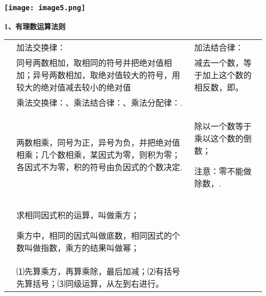 \hypertarget{ux5b66ux79d1ux7f51www.zxxk.com--ux6559ux80b2ux8d44ux6e90ux95e8ux6237ux63d0ux4f9bux8bd5ux9898ux8bd5ux5377ux6559ux6848ux8bfeux4ef6ux6559ux5b66ux8bbaux6587ux7d20ux6750ux7b49ux5404ux7c7bux6559ux5b66ux8d44ux6e90ux5e93ux4e0bux8f7dux8fd8ux6709ux5927ux91cfux4e30ux5bccux7684ux6559ux5b66ux8d44ux8baf-1}{%
\subsubsection{\texorpdfstring{\protect\texttt{[image: image5.png]}}{学科网(www.zxxk.com)-\/-教育资源门户，提供试题试卷、教案、课件、教学论文、素材等各类教学资源库下载，还有大量丰富的教学资讯！}}\label{ux5b66ux79d1ux7f51www.zxxk.com--ux6559ux80b2ux8d44ux6e90ux95e8ux6237ux63d0ux4f9bux8bd5ux9898ux8bd5ux5377ux6559ux6848ux8bfeux4ef6ux6559ux5b66ux8bbaux6587ux7d20ux6750ux7b49ux5404ux7c7bux6559ux5b66ux8d44ux6e90ux5e93ux4e0bux8f7dux8fd8ux6709ux5927ux91cfux4e30ux5bccux7684ux6559ux5b66ux8d44ux8baf-1}}

\textbf{1、有理数运算法则}

\begin{longtable}[]{@{}lll@{}}
\toprule
\endhead
& 加法交换律： & 加法结合律：\tabularnewline
&
同号两数相加，取相同的符号并把绝对值相加；异号两数相加，取绝对值较大的符号，用较大的绝对值减去较小的绝对值
& 减去一个数，等于加上这个数的相反数，即。\tabularnewline
& 乘法交换律：、乘法结合律：、乘法分配律：. &\tabularnewline
\begin{minipage}[t]{0.30\columnwidth}\raggedright
\strut
\end{minipage} & \begin{minipage}[t]{0.30\columnwidth}\raggedright
两数相乘，同号为正，异号为负，并把绝对值相乘；几个数相乘，某因式为零，则积为零；各因式不为零，积的符号由负因式的个数决定.\strut
\end{minipage} & \begin{minipage}[t]{0.30\columnwidth}\raggedright
除以一个数等于乘以这个数的倒数；

注意：零不能做除数，.\strut
\end{minipage}\tabularnewline
\begin{minipage}[t]{0.30\columnwidth}\raggedright
\strut
\end{minipage} & \begin{minipage}[t]{0.30\columnwidth}\raggedright
求相同因式积的运算，叫做乘方；

乘方中，相同的因式叫做底数，相同因式的个数叫做指数，乘方的结果叫做幂；\strut
\end{minipage} & \begin{minipage}[t]{0.30\columnwidth}\raggedright
\strut
\end{minipage}\tabularnewline
&
⑴先算乘方，再算乘除，最后加减；⑵有括号先算括号；⑶同级运算，从左到右进行。
&\tabularnewline
\bottomrule
\end{longtable}

